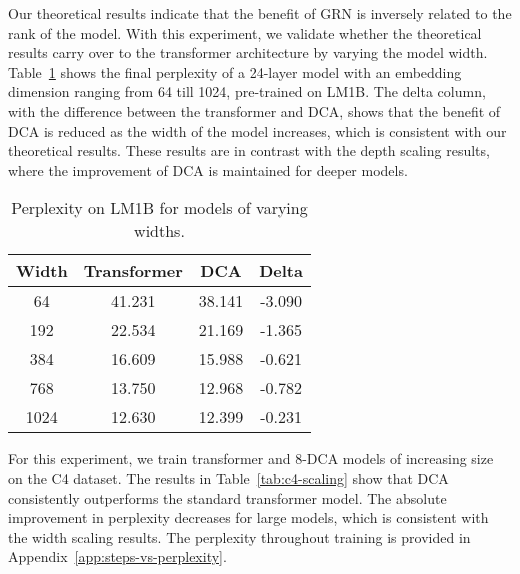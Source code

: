 Our theoretical results indicate that the benefit of GRN is inversely related to the rank of the model. With this experiment, we validate whether the theoretical results carry over to the transformer architecture by varying the model width. Table~\ref{tab:width-effect} shows the final perplexity of a 24-layer model with an embedding dimension ranging from 64 till 1024, pre-trained on LM1B. The delta column, with the difference between the transformer and DCA, shows that the benefit of DCA is reduced as the width of the model increases, which is consistent with our theoretical results. These results are in contrast with the depth scaling results, where the improvement of DCA is maintained for deeper models.

\begin{table}[h]
    \vskip -0.1in
    \caption{Perplexity on LM1B for models of varying widths.}
    \label{tab:width-effect}
    \vskip 0.15in
    \begin{center}
    \begin{small}
    \begin{sc}
    \begin{tabular}{c|ccc}
        \toprule
        Width & Transformer & DCA & Delta  \\
        \midrule
        64 & 41.231 & 38.141 & -3.090 \\
        192 & 22.534 & 21.169 & -1.365 \\
        384 & 16.609 & 15.988 & -0.621 \\
        768 & 13.750 & 12.968 & -0.782 \\
        1024 & 12.630 & 12.399 & -0.231 \\
        \bottomrule
    \end{tabular}
    \end{sc}
    \end{small}
    \end{center}
    \vskip -0.1in
\end{table}

 For this experiment, we train transformer and 8-DCA models of increasing size on the C4 dataset. The results in Table~\ref{tab:c4-scaling} show that DCA consistently outperforms the standard transformer model. The absolute improvement in perplexity decreases for large models, which is consistent with the width scaling results. The perplexity throughout training is provided in Appendix~\ref{app:steps-vs-perplexity}.

